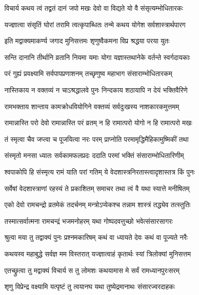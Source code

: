 \twolineshloka
{विचार्य कथय त्वं तद्व्रतं दानं जपो मखः}
{देवो वा विद्यते यो वै संसृत्यम्भोधितारकः}%

\twolineshloka
{यज्ज्ञात्वा संसृतिं घोरां तरामि त्वत्कृपाब्धितः}
{तन्मे कथय योगेश सर्वशास्त्रार्थपारग}%

\twolineshloka
{इति मद्वाक्यमाकर्ण्य जगाद मुनिसत्तमः}
{शृणुष्वैकमना विप्र श्रद्धया परया युतः}%

\twolineshloka
{सन्ति दानानि तीर्थानि व्रतानि नियमा यमाः}
{योगा यज्ञास्तथानेके वर्तन्ते स्वर्गदायकाः}%

\twolineshloka
{परं गुह्यं प्रवक्ष्यामि सर्वपापप्रणाशनम्}
{तच्छृणुष्व महाभाग संसाराम्भोधितारकम्}%

\twolineshloka
{नास्तिकाय न वक्तव्यं न चाऽश्रद्धालवे पुनः}
{निन्दकाय शठायापि न देयं भक्तिवैरिणे}%

\twolineshloka
{रामभक्ताय शान्ताय कामक्रोधवियोगिने}
{वक्तव्यं सर्वदुःखस्य नाशकारकमुत्तमम्}%

\twolineshloka
{रामान्नास्ति परो देवो रामान्नास्ति परं व्रतम्}
{न हि रामात्परो योगो न हि रामात्परो मखः}%

\twolineshloka
{तं स्मृत्वा चैव जप्त्वा च पूजयित्वा नरः परम्}
{प्राप्नोति परमामृद्धिमैहिकामुष्मिकीं तथा}%

\twolineshloka
{संस्मृतो मनसा ध्यातः सर्वकामफलप्रदः}
{ददाति परमां भक्तिं संसाराम्भोधितारिणीम्}%

\twolineshloka
{श्वपाकोपि हि संस्मृत्य रामं याति परां गतिम्}
{ये वेदशास्त्रनिरतास्त्वादृशास्तत्र किं पुनः}%

\twolineshloka
{सर्वेषां वेदशास्त्राणां रहस्यं ते प्रकाशितम्}
{समाचर तथा त्वं वै यथा स्यात्ते मनीषितम्}%

\twolineshloka
{एको देवो रामचन्द्रो व्रतमेकं तदर्चनम्}
{मन्त्रोऽप्येकश्च तन्नाम शास्त्रं तद्ध्येव तत्स्तुतिः}%

\twolineshloka
{तस्मात्सर्वात्मना रामचन्द्रं भजमनोहरम्}
{यथा गोष्पदवत्तुच्छो भवेत्संसारसागरः}%

\twolineshloka
{श्रुत्वा मया तु तद्वाक्यं पुनः प्रश्नमकारिषम्}
{कथं वा ध्यायते देवः कथं वा पूज्यते नरैः}%

\twolineshloka
{कथयस्व महाबुद्धे सर्वज्ञ मम विस्तरात्}
{यज्ज्ञात्वाहं कृतार्थः स्यां त्रिलोक्यां मुनिसत्तम}%

\twolineshloka
{एतच्छ्रुत्वा तु मद्वाक्यं विचार्य स तु लोमशः}
{कथयामास मे सर्वं रामध्यानपुरःसरम्}%

\twolineshloka
{शृणु विप्रेन्द्र वक्ष्यामि यत्पृष्टं तु त्वयानघ}
{यथा तुष्येद्रमानाथः संसारज्वरदाहकः}%


